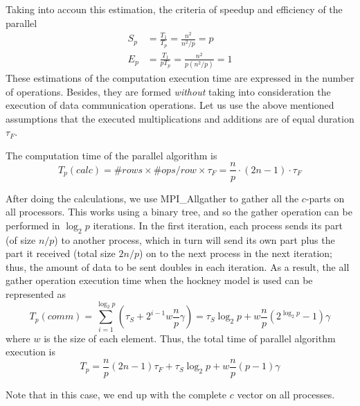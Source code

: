 Taking into accoun this estimation, the criteria of speedup and efficiency of the parallel
\begin{align}
  S_p &= \frac{T_1}{T_p} = \frac{n^2}{n^2/p} = p \\
  E_p &= \frac{T_1}{pT_p} = \frac{n^2}{p(n^2/p)} = 1
\end{align}
These estimations of the computation execution time are expressed in the number of operations. Besides, they are formed \emph{without} taking into consideration the execution of data communication operations. Let us use the above mentioned assumptions that the executed multiplications and additions are of equal duration $\tau_F$.

The computation time of the parallel algorithm is
\begin{equation}
  T_p(calc) = \# rows \times \# ops/row \times \tau_F = \frac{n}{p} \cdot (2n-1) \cdot \tau_F
\end{equation}

After doing the calculations, we use MPI\_Allgather to gather all the $c$-parts on all processors. This works using a binary tree, and so the gather operation can be performed in $\log_2 p$ iterations. In the first iteration, each process sends its part (of size $n/p$) to another process, which in turn will send its own part plus the part it received (total size $2n/p$) on to the next process in the next iteration; thus, the amount of data to be sent doubles in each iteration. As a result, the all gather operation execution time when the hockney model is used can be represented as
\begin{equation}
  T_p (comm) = \sum_{i=1}^{\log_2 p} \left( \tau_S + 2^{i-1} w \frac{n}{p} \gamma \right)
  = \tau_S\log_2 p + w \frac{n}{p} \left( 2^{\log_2 p} -1 \right) \gamma
\end{equation}
where $w$ is the size of each element. Thus, the total time of parallel algorithm execution is
\begin{equation}
  T_p = \frac{n}{p} (2n-1) \tau_F + \tau_S \log_2 p + w \frac{n}{p}(p-1)\gamma
\end{equation}


Note that in this case, we end up with the complete $c$ vector on all processes.


